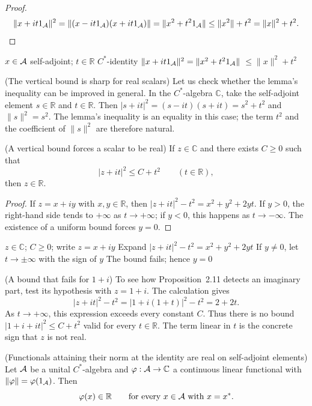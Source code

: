 \begin{proof}[Proof]
\[
\|x+it1_\mathcal A\|^2
=\|(x-it1_\mathcal A)(x+it1_\mathcal A)\|
=\|x^2+t^2 1_\mathcal A\|
\le\|x^2\|+t^2
=\|x\|^2+t^2.
\]
\end{proof}

\proofdiagram
{$x\in\mathcal A$ self-adjoint; $t\in\mathbb R$}
{$C^*$-identity}
{$\|x+it1_\mathcal A\|^2=\|x^2+t^2 1_\mathcal A\|$}
{$\le\|x\|^2+t^2$}

\begin{cthejemplo}{(The vertical bound is sharp for real scalars)}
Let us check whether the lemma's inequality can be improved in general.
In the $C^*$-algebra $\mathbb C$, take the self-adjoint element
$s\in\mathbb R$ and $t\in\mathbb R$. Then
$|s+it|^2=(s-it)(s+it)=s^2+t^2$ and $\|s\|^2=s^2$.
The lemma's inequality is an equality in this case; the term
$t^2$ and the coefficient of $\|s\|^2$ are therefore natural.
\end{cthejemplo}

\begin{cthproposicion}{(A vertical bound forces a scalar to be real)}
If $z\in\mathbb C$ and there exists $C\ge0$ such that
\[
 |z+it|^2\le C+t^2\qquad(t\in\mathbb R),
\]
then $z\in\mathbb R$.
\end{cthproposicion}

\begin{proof}[Proof]
If $z=x+iy$ with $x,y\in\mathbb R$, then
$|z+it|^2-t^2=x^2+y^2+2yt$. If $y>0$, the right-hand side tends to $+\infty$
as $t\to+\infty$; if $y<0$, this happens as $t\to-\infty$. The existence
of a uniform bound forces $y=0$.
\end{proof}

\proofdiagram
{$z\in\mathbb C$; $C\ge0$; write $z=x+iy$}
{Expand $|z+it|^2-t^2=x^2+y^2+2yt$}
{If $y\neq0$, let $t\to\pm\infty$ with the sign of $y$}
{The bound fails; hence $y=0$}

\begin{cthejemplo}{(A bound that fails for $1+i$)}
To see how Proposition~2.11 detects an imaginary part, test its hypothesis with
$z=1+i$. The calculation gives
\[
 |z+it|^2-t^2=|1+i(1+t)|^2-t^2=2+2t.
\]
As $t\to+\infty$, this expression exceeds every constant $C$. Thus there is
no bound $|1+i+it|^2\le C+t^2$ valid for every $t\in\mathbb R$.
The term linear in $t$ is the concrete sign that $z$ is not real.
\end{cthejemplo}

\begin{cthproposicion}{(Functionals attaining their norm at the identity are real on self-adjoint elements)}
Let $\mathcal A$ be a unital $C^*$-algebra and $\varphi:\mathcal A\to\mathbb C$ a continuous
linear functional with $\|\varphi\|=\varphi(1_\mathcal A)$. Then
\[
 \varphi(x)\in\mathbb R\qquad\text{for every }x\in\mathcal A\text{ with }x=x^*.
\]
\end{cthproposicion}

